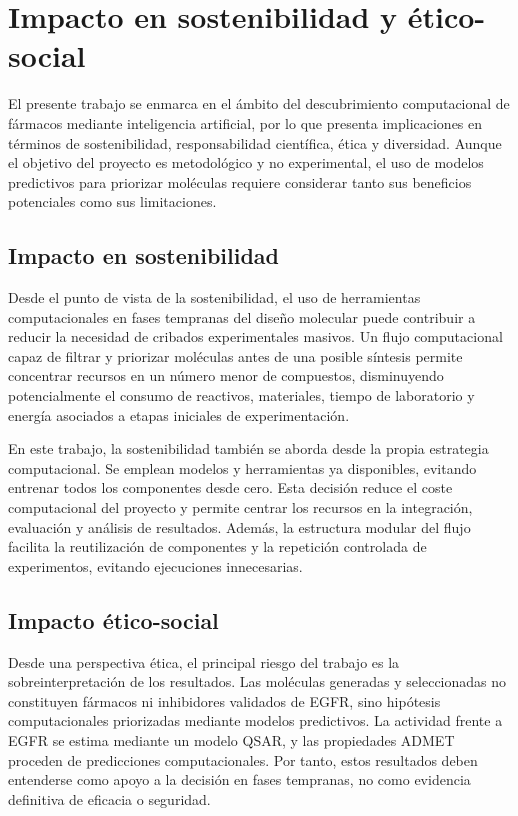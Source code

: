 \documentclass[IB]{TFUOC}%
\begin{document}
\section{Impacto en sostenibilidad y ético-social}
\label{s:etic}

El presente trabajo se enmarca en el ámbito del descubrimiento computacional de fármacos mediante inteligencia artificial, por lo que presenta implicaciones en términos de sostenibilidad, responsabilidad científica, ética y diversidad. Aunque el objetivo del proyecto es metodológico y no experimental, el uso de modelos predictivos para priorizar moléculas requiere considerar tanto sus beneficios potenciales como sus limitaciones.

\subsection*{Impacto en sostenibilidad}

Desde el punto de vista de la sostenibilidad, el uso de herramientas computacionales en fases tempranas del diseño molecular puede contribuir a reducir la necesidad de cribados experimentales masivos. Un flujo computacional capaz de filtrar y priorizar moléculas antes de una posible síntesis permite concentrar recursos en un número menor de compuestos, disminuyendo potencialmente el consumo de reactivos, materiales, tiempo de laboratorio y energía asociados a etapas iniciales de experimentación.

En este trabajo, la sostenibilidad también se aborda desde la propia estrategia computacional. Se emplean modelos y herramientas ya disponibles, evitando entrenar todos los componentes desde cero. Esta decisión reduce el coste computacional del proyecto y permite centrar los recursos en la integración, evaluación y análisis de resultados. Además, la estructura modular del flujo facilita la reutilización de componentes y la repetición controlada de experimentos, evitando ejecuciones innecesarias.

\subsection*{Impacto ético-social}

Desde una perspectiva ética, el principal riesgo del trabajo es la sobreinterpretación de los resultados. Las moléculas generadas y seleccionadas no constituyen fármacos ni inhibidores validados de EGFR, sino hipótesis computacionales priorizadas mediante modelos predictivos. La actividad frente a EGFR se estima mediante un modelo QSAR, y las propiedades ADMET proceden de predicciones computacionales. Por tanto, estos resultados deben entenderse como apoyo a la decisión en fases tempranas, no como evidencia definitiva de eficacia o seguridad.
\end{document}
